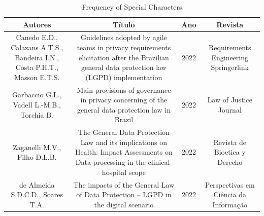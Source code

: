 \begin{table}
  \caption{Frequency of Special Characters}
  \label{tab:freq}
  \begin{tabular}{cccc}
    \toprule
     Autores&Título&      Ano&Revista\\
    \midrule
    Canedo E.D., Calazans A.T.S., Bandeira I.N., Costa P.H.T., Masson E.T.S. & Guidelines adopted by agile teams in privacy requirements elicitation after the Brazilian general data protection law (LGPD) implementation&  2022&Requirements Engineering      
     Springerlink\\
    Garbaccio G.L., Vadell L.-M.B., Torchia B.
& Main provisions of governance in privacy concerning of the general data protection law in Brazil 
&  2022
&Law of Justice Journal
\\
    Zaganelli M.V., Filho D.L.B.
& The General Data Protection Law and its implications on Health: Impact Assessments on Data processing in the clinical-hospital scope 
&  2022
&Revista de Bioetica y Derecho
\\
    de Almeida S.D.C.D., Soares T.A.& The impacts of the General Law of Data Protection – LGPD in the digital scenario &  2022&Perspectivas em Ciência da Informação\\


\end{tabular}
\end{table}
